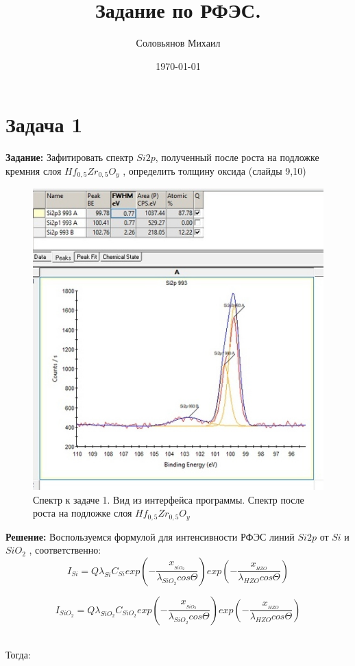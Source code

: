 \documentclass[a4paper,12pt]{article} %
\author{Соловьянов Михаил }
\title{Задание  по РФЭС.}
\date{\today}
\begin{document}
\maketitle


\section{Задача 1}
\textbf{Задание:} Зафитировать спектр $ Si 2p $, полученный после роста на подложке кремния слоя
$ Hf_{0,5} Zr_{0,5} O_y $ , определить толщину оксида (слайды 9,10)




\begin{figure}[H]
\centering
  \includegraphics[width=0.6\linewidth]{1.jpg}
  \caption{Спектр к задаче 1. Вид из интерфейса программы. Спектр после роста на подложке слоя $ Hf_{0,5} Zr_{0,5} O_y $ }
  \label{fig1}
\end{figure}


\textbf{Решение:} Воспользуемся формулой для интенсивности РФЭС линий $ Si 2p $  от  $ Si  $ и $ SiO_2  $ , соответственно:\\

\begin{equation}
	I_{Si} = Q \lambda_{Si}C_{Si} exp( - \frac{x__{SiO_2}}{\lambda_{SiO_2}cos\Theta})exp( - \frac{x__{HZO}}{\lambda_{HZO}cos\Theta})
\end{equation}

\begin{equation}
	I_{SiO_2} = Q \lambda_{SiO_2}C_{SiO_2} exp( - \frac{x__{SiO_2}}{\lambda_{SiO_2}cos\Theta})exp( - \frac{x__{HZO}}{\lambda_{HZO}cos\Theta})
\end{equation}

\\
Тогда:
\end{document}
